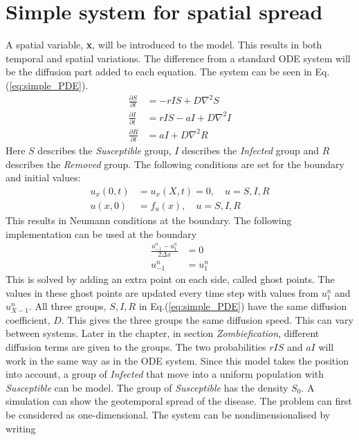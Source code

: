 \documentclass[%
twoside,                 %
final,                   %
10pt]{article}
\begin{document}
\section{Simple system for spatial spread}
A spatial variable, \textbf{x}, will be introduced to the model. This results in both temporal and spatial variations. The difference from a standard ODE system will be the diffusion part added to each equation. The system can be seen in Eq.(\ref{eq:simple_PDE}). 
\begin{equation} \label{eq:simple_PDE}
	\begin{aligned}
	\frac{\partial S}{\partial t} &= -rIS + D\nabla ^2 S\\
	\frac{\partial I}{\partial t} &= rIS- aI + D\nabla ^2 I\\
	\frac{\partial R}{\partial t} &= aI + D\nabla ^2 R
	\end{aligned}
\end{equation}
Here $S$ describes the \emph{Susceptible} group, $I$ describes the \emph{Infected} group and $R$ describes the \emph{Removed} group. The following conditions are set for the boundary and initial values:
\begin{equation} \label{eq:boundary_initial}
	\begin{aligned}
	u_x(0,t) &= u_x(X,t) = 0,\quad u = S,I,R\\
	u(x,0) &= f_u(x),\quad u= S,I,R
	\end{aligned}
\end{equation}
This results in Neumann conditions at the boundary. The following implementation can be used at the boundary
\begin{equation}
	\begin{aligned}
	\frac{u_{-1}^n - u_1^n}{2\Delta x} &= 0 \\
	u_{-1}^n &= u_1^n
	\end{aligned}
\end{equation}
This is solved by adding an extra point on each side, called ghost points. The values in these ghost points are updated every time step with values from $u_1^n$ and $u_{X-1}^n$. All three groups, $S,I,R$ in Eq.(\ref{eq:simple_PDE}) have the same diffusion coefficient, $D$. This gives the three groups the same diffusion speed. This can vary between systems. Later in the chapter, in section \emph{Zombiefication}, different diffusion terms are given to the groups. The two probabilities $rIS$ and $aI$ will work in the same way as in the ODE system. Since this model takes the position into account, a group of \emph{Infected} that move into a uniform population with \emph{Susceptible} can be model. The group of \emph{Susceptible} has the density $S_0$. A simulation can show the geotemporal spread of the disease. The problem can first be considered as one-dimensional. The system can be nondimensionalised by writing 
\end{document}
